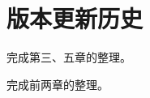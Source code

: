 \chapter*{版本更新历史}


\begin{change}
  \item 完成第三、五章的整理。
\end{change}


\begin{change}
  \item 完成前两章的整理。
\end{change}